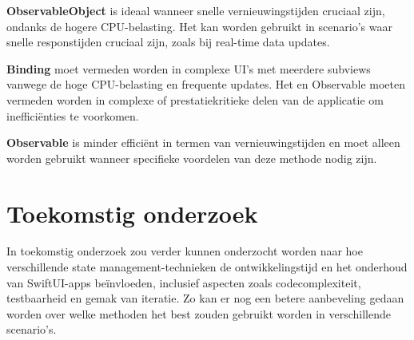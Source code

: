\documentclass[a0,portrait]{hogent-poster}
\begin{document}
\begin{multicols}{2}
\textbf{ObservableObject} is ideaal wanneer snelle vernieuwingstijden cruciaal zijn, ondanks de hogere CPU-belasting. Het kan worden gebruikt in scenario’s waar snelle responstijden cruciaal zijn, zoals bij real-time data updates.

\textbf{Binding} moet vermeden worden in complexe UI’s met meerdere subviews vanwege de hoge CPU-belasting en frequente updates. Het en Observable moeten vermeden worden in complexe of prestatiekritieke delen van de applicatie om inefficiënties te voorkomen.

\textbf{Observable} is minder efficiënt in termen van vernieuwingstijden en moet alleen worden gebruikt wanneer specifieke voordelen van deze methode nodig zijn.

\section{Toekomstig onderzoek}
In toekomstig onderzoek zou verder kunnen onderzocht worden naar hoe verschillende state management-technieken de ontwikkelingstijd en het onderhoud van SwiftUI-apps beïnvloeden, inclusief aspecten zoals codecomplexiteit, testbaarheid en gemak van iteratie. Zo kan er nog een betere aanbeveling gedaan worden over welke methoden het best zouden gebruikt worden in verschillende scenario's.

\end{multicols}
\end{document}

